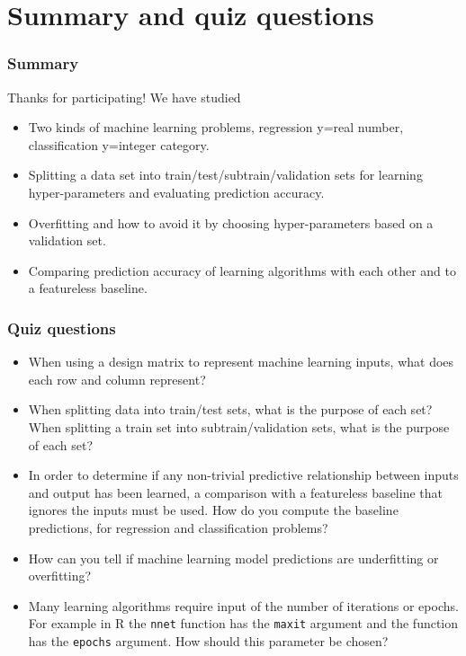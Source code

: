 \documentclass{beamer}
\begin{document}
\section{Summary and quiz questions}

\begin{frame}
  \frametitle{Summary}
  Thanks for participating! We have studied
  \begin{itemize}
  \item Two kinds of machine learning problems, regression y=real number,
    classification y=integer category.
  \item Splitting a data set into train/test/subtrain/validation sets
    for learning hyper-parameters and evaluating prediction accuracy.
  \item Overfitting and how to avoid it by choosing hyper-parameters
    based on a validation set.
  \item Comparing prediction accuracy of learning algorithms with each
    other and to a featureless baseline.
  \end{itemize}
\end{frame}

\begin{frame}
  \frametitle{Quiz questions}
  \begin{itemize}
\item When using a design matrix to represent machine learning inputs,
  what does each row and column represent?
\item When splitting data into train/test sets, what is the purpose of
  each set? When splitting a train set into subtrain/validation sets,
  what is the purpose of each set?
\item In order to determine if any non-trivial predictive relationship
  between inputs and output has been learned, a comparison with a
  featureless baseline that ignores the inputs must be used. How do you compute
  the baseline predictions, for regression and classification
  problems?
\item How can you tell if machine learning model predictions are
  underfitting or overfitting?
\item Many learning algorithms require input of the number of
  iterations or epochs. For example in R the \texttt{nnet} function
  has the \texttt{maxit} argument and the  function
  has the \texttt{epochs} argument. How should this parameter be
  chosen?
  \end{itemize}
\end{frame}
 
\end{document}
